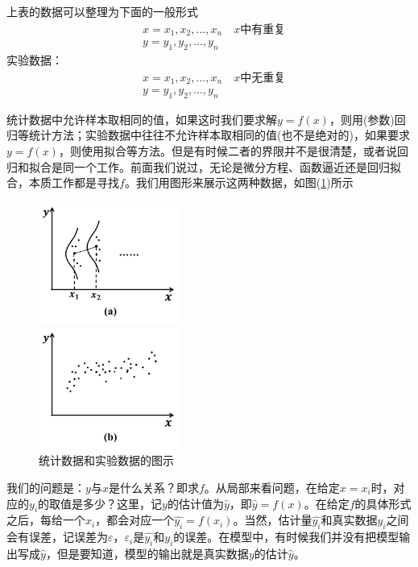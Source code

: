     上表的数据可以整理为下面的一般形式
    \begin{align*}
    &x = x_1,x_2,\dots,x_n \quad x\text{中有重复}\\
    &y = y_1,y_2,\dots,y_n
    \end{align*}
    实验数据：
    \begin{align*}
    &x = x_1,x_2,\dots,x_n \quad x\text{中无重复}\\
    &y = y_1,y_2,\dots,y_n
    \end{align*}
    \par
    统计数据中允许样本取相同的值，如果这时我们要求解$y = f(x)$，则用(参数)回归等统计方法；实验数据中往往不允许样本取相同的值(也不是绝对的)，如果要求$y = f(x)$，则使用拟合等方法。但是有时候二者的界限并不是很清楚，或者说回归和拟合是同一个工作。前面我们说过，无论是微分方程、函数逼近还是回归拟合，本质工作都是寻找$f$。我们用图形来展示这两种数据，如图(\ref{fig:统计数据和实验数据的图示})所示
    \begin{figure}[H]
      \centering
      \begin{varwidth}[t]{\textwidth}
        \vspace{0pt}
        \includegraphics[height=4cm]{images/statitics_data_and_experiment_data1.jpg}
      \end{varwidth}
      \qquad \qquad
      \begin{varwidth}[t]{\textwidth}
        \vspace{0pt}
        \includegraphics[height=4cm]{images/statitics_data_and_experiment_data2.jpg}
      \end{varwidth}
    \caption{统计数据和实验数据的图示}
    \label{fig:统计数据和实验数据的图示}
    \end{figure}
    \par
    我们的问题是：$y$与$x$是什么关系？即求$f$。从局部来看问题，在给定$x = x_i$时，对应的$y_i$的取值是多少？这里，记$y$的估计值为$\hat{y}$，即$\hat{y} = f(x)$。在给定$f$的具体形式之后，每给一个$x_i$，都会对应一个$\hat{y_i} = f(x_i)$。当然，估计量$\hat{y_i}$和真实数据$y_i$之间会有误差，记误差为$\varepsilon$，$\varepsilon_i$是$\hat{y_i}$和$y_i$的误差。在模型中，有时候我们并没有把模型输出写成$\hat{y}$，但是要知道，模型的输出就是真实数据$y$的估计$\hat{y}$。
